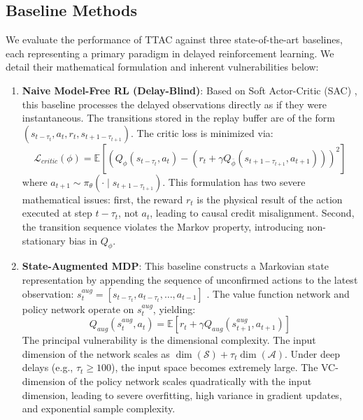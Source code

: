 \documentclass[manuscript, screen, review]{jair}
\begin{document}
\subsection{Baseline Methods}
We evaluate the performance of TTAC against three state-of-the-art baselines, each representing a primary paradigm in delayed reinforcement learning. We detail their mathematical formulation and inherent vulnerabilities below:
\begin{enumerate}
    \item \textbf{Naive Model-Free RL (Delay-Blind)}: Based on Soft Actor-Critic (SAC) \citep{haarnoja2018soft}, this baseline processes the delayed observations directly as if they were instantaneous. The transitions stored in the replay buffer are of the form $(s_{t-\tau_t}, a_t, r_t, s_{t+1-\tau_{t+1}})$. The critic loss is minimized via:
    \begin{equation}
        \mathcal{L}_{critic}(\phi) = \mathbb{E} \left[ \left( Q_\phi(s_{t-\tau_t}, a_t) - \left( r_t + \gamma Q_{\bar{\phi}}(s_{t+1-\tau_{t+1}}, a_{t+1}) \right) \right)^2 \right]
    \end{equation}
    where $a_{t+1} \sim \pi_\theta(\cdot \mid s_{t+1-\tau_{t+1}})$. This formulation has two severe mathematical issues: first, the reward $r_t$ is the physical result of the action executed at step $t-\tau_t$, not $a_t$, leading to causal credit misalignment. Second, the transition sequence violates the Markov property, introducing non-stationary bias in $Q_\phi$.
    
    \item \textbf{State-Augmented MDP}: This baseline constructs a Markovian state representation by appending the sequence of unconfirmed actions to the latest observation: $s^{aug}_t = [s_{t-\tau_t}, a_{t-\tau_t}, \dots, a_{t-1}]$ \citep{katsikopoulos2003markov}. The value function network and policy network operate on $s^{aug}_t$, yielding:
    \begin{equation}
        Q_{aug}(s^{aug}_t, a_t) = \mathbb{E} \left[ r_t + \gamma Q_{aug}(s^{aug}_{t+1}, a_{t+1}) \right]
    \end{equation}
    The principal vulnerability is the dimensional complexity. The input dimension of the network scales as $\dim(\mathcal{S}) + \tau_t \dim(\mathcal{A})$. Under deep delays (e.g., $\tau_t \ge 100$), the input space becomes extremely large. The VC-dimension of the policy network scales quadratically with the input dimension, leading to severe overfitting, high variance in gradient updates, and exponential sample complexity.
    

\end{enumerate}
\end{document}
